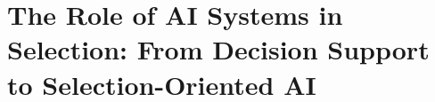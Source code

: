 \section{The Role of AI Systems in Selection: From Decision Support to Selection-Oriented AI}







